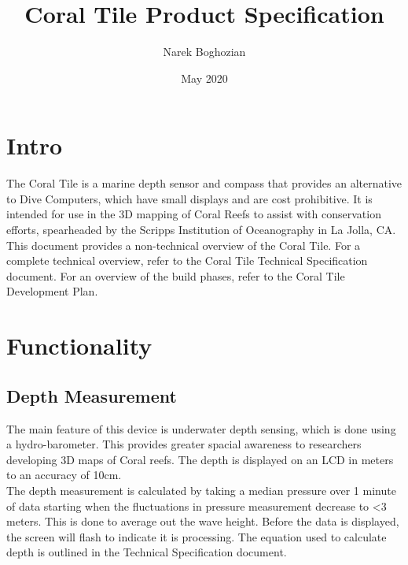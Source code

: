 \documentclass{article}
\title{Coral Tile Product Specification}
\author{Narek Boghozian}
\date{May 2020}
\begin{document}
\maketitle
\tableofcontents
\pagebreak






\section{Intro}

The Coral Tile is a marine depth sensor and compass that provides an alternative to Dive Computers, which have small displays and are cost prohibitive. It is intended for use in the 3D mapping of Coral Reefs to assist with conservation efforts, spearheaded by the Scripps Institution of Oceanography in La Jolla, CA.\\[12pt]
This document provides a non-technical overview of the Coral Tile. For a complete technical overview, refer to the Coral Tile Technical Specification document. For an overview of the build phases, refer to the Coral Tile Development Plan.



\pagebreak


\section{Functionality}

\subsection{Depth Measurement}
The main feature of this device is underwater depth sensing, which is done using a hydro-barometer. This provides greater spacial awareness to researchers developing 3D maps of Coral reefs. The depth is displayed on an LCD in meters to an accuracy of 10cm.\\[12pt]
The depth measurement is calculated by taking a median pressure over 1 minute of data starting when the fluctuations in pressure measurement decrease to <3 meters. This is done to average out the wave height. Before the data is displayed, the screen will flash to indicate it is processing. The equation used to calculate depth is outlined in the Technical Specification document.
\end{document}
